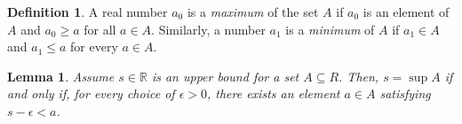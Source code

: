 \documentclass{amsart}
\newtheorem*{lemma}{Lemma}
\theoremstyle{definition}
\newtheorem*{definition}{Definition}
\newcommand{\R}{\mathbb{R}}
\begin{document}
\begin{definition}
  A real number $a_0$ is a \emph{maximum} of the set $A$ if $a_0$ is an element
  of $A$ and $a_0 \ge a$ for all $a \in A$. Similarly, a number $a_1$ is a
  \emph{minimum} of $A$ if $a_1 \in A$ and $a_1 \le a$ for every $a \in A$.
\end{definition}

\begin{lemma}
  Assume $s \in \R$ is an upper bound for a set $A \subseteq R$. Then, $s =
  \sup{A}$ if and only if, for every choice of $\epsilon > 0$, there exists an
  element $a \in A$ satisfying $s - \epsilon < a$.
\end{lemma}
\end{document}
